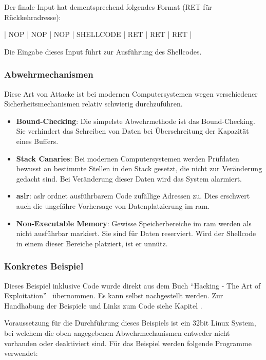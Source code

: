 \documentclass[11pt, a4paper]{article}
\begin{document}
Der finale Input hat dementsprechend folgendes Format (RET für Rückkehradresse):
\newline
\begin{center}
	\centerline{| NOP | NOP | NOP | SHELLCODE | RET | RET | RET |}
\end{center}
Die Eingabe dieses Input führt zur Ausführung des Shellcodes.

\subsubsection{Abwehrmechanismen}
Diese Art von Attacke ist bei modernen Computersystemen wegen verschiedener Sicherheitsmechanismen relativ schwierig durchzuführen.

\begin{itemize}
	\item \textbf{Bound-Checking}: Die simpelste Abwehrmethode ist das Bound-Checking. Sie verhindert das Schreiben von Daten bei Überschreitung der Kapazität eines Buffers.
	\item \textbf{Stack Canaries}: Bei modernen Computersystemen werden Prüfdaten bewusst an bestimmte Stellen in den Stack gesetzt, die nicht zur Veränderung gedacht sind. Bei Veränderung dieser Daten wird das System alarmiert.~\cite{StackCan84:online}
	\item \textbf{\gls{aslr}}: \gls{aslr} ordnet ausführbarem Code zufällige Adressen zu. Dies erschwert auch die ungefähre Vorhersage von Datenplatzierung im \gls{ram}.~\cite{Whatisad68:online}
	\item \textbf{Non-Executable Memory}: Gewisse Speicherbereiche im \gls{ram} werden als nicht ausführbar markiert. Sie sind für Daten reserviert. Wird der Shellcode in einem dieser Bereiche platziert, ist er unnütz.
\end{itemize}


\subsubsection{Konkretes Beispiel}
Dieses Beispiel inklusive Code wurde direkt aus dem Buch ``Hacking - The Art of Exploitation''~\cite{erickson2008hacking} übernommen. Es kann selbst nachgestellt werden. Zur Handhabung der Beispiele und Links zum Code siehe Kapitel .

Voraussetzung für die Durchführung dieses Beispiels ist ein 32bit Linux System, bei welchem die oben angegebenen Abwehrmechanismen entweder nicht vorhanden oder deaktiviert sind. Für das Beispiel werden folgende Programme verwendet:
\end{document}
